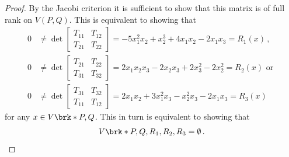 \begin{proof}
  By the Jacobi criterion it is sufficient to show that this matrix is
  of full rank on $V(P,Q)$.
  This is equivalent to showing that
  \begin{align}
    0&\neq \det\begin{bmatrix}
      T_{11}&T_{12}\\T_{21}&T_{22}
    \end{bmatrix}
    =-5x_1^2x_2+x_2^3+4x_1x_2-2x_1x_3
    =R_1(x)\,, \\
    0&\neq \det\begin{bmatrix}
      T_{21}&T_{22}\\T_{31}&T_{32}
    \end{bmatrix}
    =2x_1x_2x_3-2x_2x_3+2x_3^2-2x_2^2
    =R_2(x)\text{ or } \\
    0&\neq \det\begin{bmatrix}
      T_{31}&T_{32}\\T_{11}&T_{12}
    \end{bmatrix}
    =2x_1x_2+3x_1^2x_3-x_2^2x_3-2x_1x_3
    =R_3(x)
  \end{align}
  for any $x\in V\brk*{P,Q}$. This in turn is equivalent to showing that
  \begin{align}
    V\brk*{P,Q,R_1,R_2,R_3}=\emptyset\,.
  \end{align}
\end{proof}

